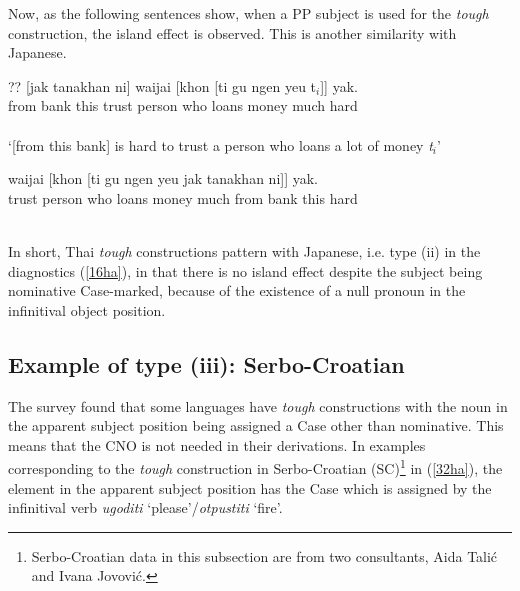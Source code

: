 \documentclass[output=paper,colorlinks,citecolor=brown,
]{langscibook}
\begin{document}
Now, as the following sentences show, when a PP subject is used for the \textit{tough} construction, the island effect is observed. This is another similarity with Japanese.

\begin{exe}
\ex \label{31ha}
\begin{xlist}
\ex \label{31aha}
\gll ?? [jak tanakhan ni]  waijai [khon [ti gu ngen yeu t$_{i}$]]  yak.\\
{} from bank this trust person who loans money much {} hard\\\\
‘[from this bank] is hard to trust a person who loans a lot of money \textit{t$_{i}$}’

\ex \label{31bha}
\gll waijai [khon  [ti gu ngen yeu jak tanakhan ni]] yak.\\
trust person who loans money much from bank this hard\\\\


\end{xlist}
\end{exe}

In short, Thai \textit{tough} constructions pattern with Japanese, i.e. type (ii) in the diagnostics (\ref{16ha}), in that there is no island effect despite the subject being nominative Case-marked, because of the existence of a null pronoun in the infinitival object position.  

\subsection{Example of type (iii): Serbo-Croatian} \label{s3.4ha}
The survey found that some languages have \textit{tough} constructions with the noun in the apparent subject position being assigned a Case other than nominative. This means that the CNO is not needed in their derivations. In examples corresponding to the \textit{tough} construction in Serbo-Croatian (SC)\footnote{Serbo-Croatian data in this subsection are from two consultants, Aida Talić and Ivana Jovović.}  in (\ref{32ha}), the element in the apparent subject position has the Case which is assigned by the infinitival verb \textit{ugoditi} ‘please’/\textit{otpustiti} ‘fire’. 
\end{document}
